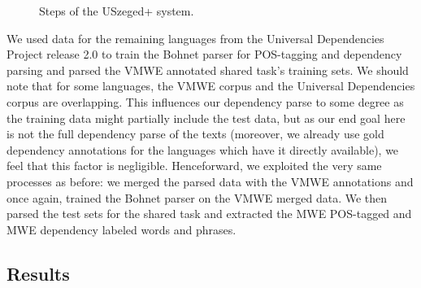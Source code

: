 \documentclass[output=paper,
modfonts,
]{langscibook}
\begin{document}
\begin{figure}
\vspace{2em}
\caption{Steps of the USzeged+ system.}
\label{szeged+}
\end{figure}

We used data for the remaining languages from the Universal Dependencies Project release 2.0 \citep{univdep} 
to train the Bohnet parser for POS-tagging and dependency parsing and parsed the VMWE annotated shared task's training sets.
We should note that for some languages, the VMWE corpus and the Universal Dependencies corpus are overlapping. This influences our dependency parse to some degree as the training data might partially include the test data, but as our end goal here is not the full dependency parse of the texts (moreover, we already use gold dependency annotations for the languages which have it directly available), we feel that this factor is negligible. Henceforward, we exploited the very same processes as before: we merged the parsed data with the VMWE annotations and once again, trained the Bohnet parser on the VMWE merged data. We then parsed the test sets for the shared task and extracted the MWE POS-tagged and MWE dependency labeled words and phrases. 

\subsection{Results}
\end{document}
